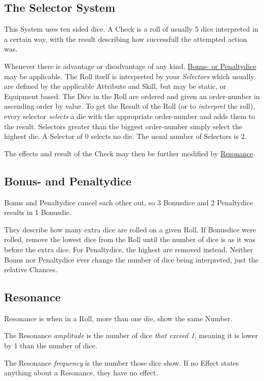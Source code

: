     \subsection{The Selector System}\label{subsec:selectorsystem}
    This System uses  ten sided dice.
    A Check is a roll of usually 5 dice interpreted in a certain way,
    with the result describing how successfull the attempted action was.\par
    Whenever there is advantage or disadvantage of any kind,
    \hyperref[subsec:bonus--and-penaltydice]{Bonus- or Penaltydice} may be applicable.
    The Roll itself is interpreted by your \emph{Selectors} which usually are defined
    by the applicable Attribute and Skill, but may be static, or Equipment based.
    The Dice in the Roll are ordered and given an order-number in ascending order by value.
    To get the Result of the Roll (or to \emph{interpret} the roll), every selector \emph{selects} a die with the
    appropriate order-number and adds them to the result.
    Selectors greater than the biggest order-number simply select the highest die.
    A Selector of 0 selects no die.
    The usual number of Selectors is 2.\par
    The effects and result of the Check may then be further modified by \hyperref[subsec:resonance]{Resonance}.
    \vspace{1cm}

    \subsection{Bonus- and Penaltydice}\label{subsec:bonus--and-penaltydice}
    Bonus and Penaltydice cancel each other out, so 3 Bonusdice and 2 Penaltydice results in 1 Bonusdie.\par
    They describe how many extra dice are rolled on a given Roll.
    If Bonusdice were rolled,
    remove the lowest dice from the Roll until the number of dice is as it was before the extra dice.
    For Penaltydice, the highest are removed instead.
    Neither Bonus nor Penaltydice ever change the number of dice being interpreted, just the relative Chances.

    \subsection{Resonance}\label{subsec:resonance}
    Resonance is when in a Roll, more than one die, show the same Number.\par
    The Resonance \emph{amplitude} is the number of dice \emph{that exceed 1}, meaning it is lower by 1 than the
    number of dice.\par
    The Resonance \emph{frequency} is the number those dice show.
    If no Effect states anything about a Resonance, they have no effect.

